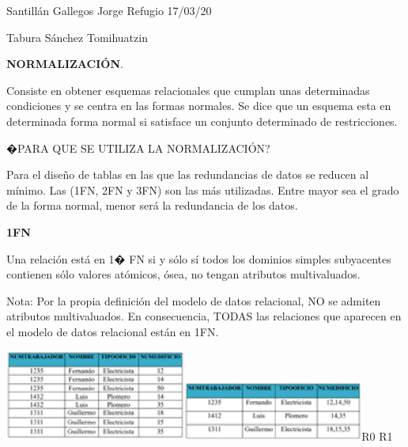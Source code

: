 \documentclass{article} %
\begin{document}


\noindent 

\noindent 

\noindent 

\noindent 

\noindent Santill\'{a}n Gallegos Jorge Refugio  17/03/20

\noindent Tabura S\'{a}nchez Tomihuatzin

\noindent \textbf{NORMALIZACI\'{O}N}.

\noindent Consiste en obtener esquemas relacionales que cumplan unas determinadas condiciones y se centra en las formas normales. Se dice que un esquema esta en determinada forma normal si satisface un conjunto determinado de restricciones.

\noindent 

\noindent �PARA QUE SE UTILIZA LA NORMALIZACI\'{O}N?

\noindent 

\noindent Para el dise\~{n}o de tablas en las que las redundancias de datos se reducen al m\'{i}nimo. Las (1FN, 2FN y 3FN) son las m\'{a}s utilizadas. Entre mayor sea el grado de la forma normal, menor ser\'{a} la redundancia de los datos.

\noindent 

\noindent \textbf{1FN}

\noindent 

\noindent Una relaci\'{o}n est\'{a} en 1� FN si y s\'{o}lo s\'{i} todos los dominios simples subyacentes contienen s\'{o}lo valores at\'{o}micos, \'{o}sea, no tengan atributos multivaluados. 

\noindent 

\noindent Nota: Por la propia definici\'{o}n del modelo de datos relacional, NO se admiten atributos multivaluados. En consecuencia, TODAS las relaciones que aparecen en el modelo de datos relacional est\'{a}n en 1FN.

\noindent \includegraphics*[width=2.34in, height=1.18in, keepaspectratio=false]{image1}\includegraphics*[width=2.34in, height=0.77in, keepaspectratio=false]{image2}R0      R1
\end{document}

